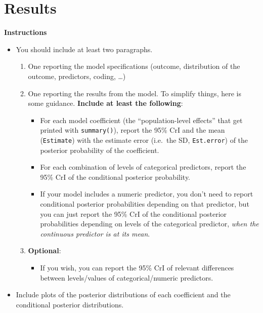 \documentclass[
]{article}
\providecommand{\tightlist}{%
  \setlength{\itemsep}{0pt}\setlength{\parskip}{0pt}}
\begin{document}
\section{Results}\label{results}

\textbf{Instructions}

\begin{itemize}
\tightlist
\item
  You should include at least two paragraphs.

  \begin{enumerate}
  \def\labelenumi{\arabic{enumi}.}
  \tightlist
  \item
    One reporting the model specifications (outcome, distribution of the
    outcome, predictors, coding, \ldots)
  \item
    One reporting the results from the model. To simplify things, here
    is some guidance. \textbf{Include at least the following}:

    \begin{itemize}
    \tightlist
    \item
      For each model coefficient (the ``population-level effects'' that
      get printed with \texttt{summary()}), report the 95\% CrI and the
      mean (\texttt{Estimate}) with the estimate error (i.e.~the SD,
      \texttt{Est.error}) of the posterior probability of the
      coefficient.
    \item
      For each combination of levels of categorical predictors, report
      the 95\% CrI of the conditional posterior probability.
    \item
      If your model includes a numeric predictor, you don't need to
      report conditional posterior probabilities depending on that
      predictor, but you can just report the 95\% CrI of the conditional
      posterior probabilities depending on levels of the categorical
      predictor, \emph{when the continuous predictor is at its mean}.
    \end{itemize}
  \item
    \textbf{Optional}:

    \begin{itemize}
    \tightlist
    \item
      If you wish, you can report the 95\% CrI of relevant differences
      between levels/values of categorical/numeric predictors.
    \end{itemize}
  \end{enumerate}
\item
  Include plots of the posterior distributions of each coefficient and
  the conditional posterior distributions.
\end{itemize}
\end{document}
